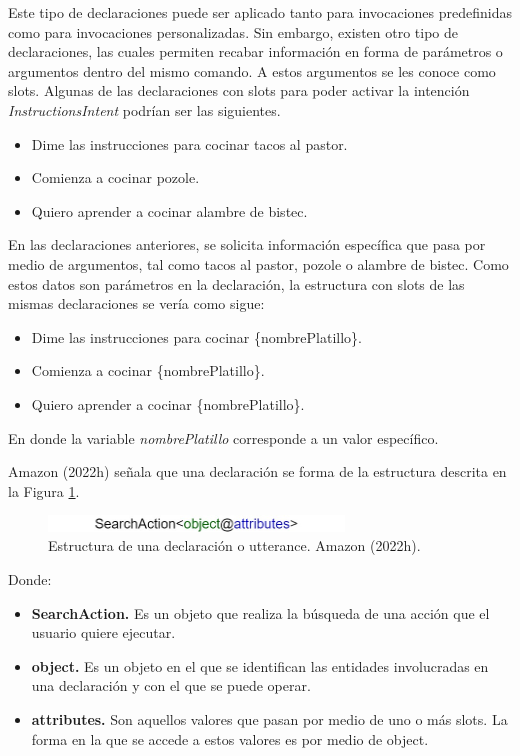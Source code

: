 Este tipo de declaraciones puede ser aplicado tanto para invocaciones predefinidas como para invocaciones personalizadas. Sin embargo, existen otro tipo de declaraciones, las cuales permiten recabar información en forma de parámetros o argumentos dentro del mismo comando. A estos argumentos se les conoce como slots. Algunas de las declaraciones con slots para poder activar la intención \textit{InstructionsIntent} podrían ser las siguientes.

\begin{itemize}
  \item Dime las instrucciones para cocinar tacos al pastor.
  \item Comienza a cocinar pozole.
  \item Quiero aprender a cocinar alambre de bistec.
\end{itemize}

En las declaraciones anteriores, se solicita información específica que pasa por medio de argumentos, tal como tacos al pastor, pozole o alambre de bistec. Como estos datos son parámetros en la declaración, la estructura con slots de las mismas declaraciones se vería como sigue:

\begin{itemize}
  \item Dime las instrucciones para cocinar \{nombrePlatillo\}.
  \item Comienza a cocinar \{nombrePlatillo\}.
  \item Quiero aprender a cocinar \{nombrePlatillo\}.
\end{itemize}

En donde la variable \textit{nombrePlatillo} corresponde a un valor específico.

Amazon (2022h) señala que una declaración se forma de la estructura descrita en la Figura \ref{fig:48}.

\begin{figure}[H]
  \centering
  \includegraphics[width=0.70\textwidth]{Cap4/Figuras/Estructura de Declaraciones.jpg}
  \caption{Estructura de una declaración o utterance. Amazon (2022h).}
  \label{fig:48}
\end{figure}

Donde:

\begin{itemize}
  \item \textbf{SearchAction.} Es un objeto que realiza la búsqueda de una acción que el usuario quiere ejecutar.
  \item \textbf{object.} Es un objeto en el que se identifican las entidades involucradas en una declaración y con el que se puede operar.
  \item \textbf{attributes.} Son aquellos valores que pasan por medio de uno o más slots. La forma en la que se accede a estos valores es por medio de object.
\end{itemize}

